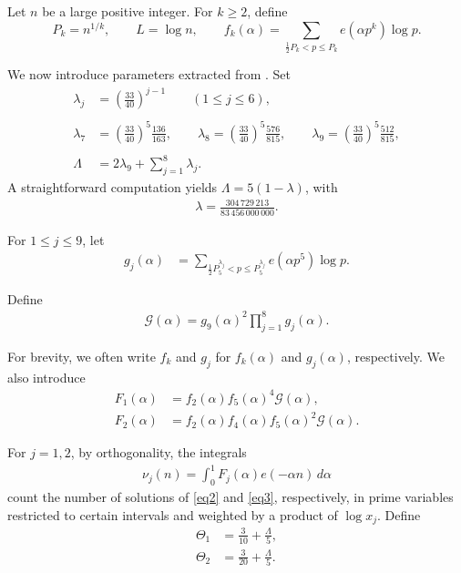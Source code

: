 \documentclass{article}
\theoremstyle{plain}
\begin{document}
Let $n$ be a large positive integer. For $k \geq 2$, define
$$P_k = n^{1/k}, \qquad L = \log n, \qquad f_k(\alpha)=\sum \limits_{\frac{1}{2}P_k < p \leq P_k} e(\alpha p^k)\log p.$$

We now introduce parameters extracted from \cite{KawadaWooley2001}. Set 
\begin{align*}
    \lambda_j&=\left(\frac{33}{40}\right)^{j-1} \qquad (1\leq j \leq 6),\\
    \\
    \lambda_7&=\left(\frac{33}{40}\right)^5\frac{136}{163},\qquad
    \lambda_8=\left(\frac{33}{40}\right)^5\frac{576}{815},\qquad \lambda_9 = \left(\frac{33}{40}\right)^5\frac{512}{815},\\ 
    \\
    \Lambda&=2\lambda_9+\sum_{j=1}^{8}\lambda_j.
\end{align*}
A straightforward computation yields $\Lambda = 5(1-\lambda)$, with 
\begin{align}\label{mu}
    \lambda=\frac{304\,729\,213}{83\,456\,000\,000}.
\end{align}

For $1\leq j \leq 9$, let 
\begin{align*}
    g_{j}(\alpha) &= \sum \limits_{\frac{1}{2}P_5^{\lambda_j} < p \leq P_5^{\lambda_j}} e(\alpha p^5)\log p.
\end{align*}

Define 
\begin{align*}
    \mathcal{G}(\alpha) = g_9(\alpha)^2\prod_{j=1}^{8}g_j(\alpha).
\end{align*}

For brevity, we often write $f_k$ and $g_j$ for $f_k(\alpha)$ and $g_j(\alpha)$, respectively. We also introduce
\begin{align*}
    F_1(\alpha)&=f_2(\alpha)f_5(\alpha)^4\mathcal{G}(\alpha),\\
    F_2(\alpha) &= f_2(\alpha)f_4(\alpha)f_5(\alpha)^2\mathcal{G}(\alpha).
\end{align*}

For $j=1,2$, by orthogonality, the integrals
\begin{align}\label{ort}
    \nu_j(n) = \int_{0}^{1} F_j(\alpha)e(-\alpha n)\,d\alpha
\end{align}
count the number of solutions of \eqref{eq2} and \eqref{eq3}, respectively, in prime variables restricted to certain intervals and weighted by a product of $\log x_j$. Define 
\begin{align*}
    \Theta_1 &= \frac{3}{10}+\frac{\Lambda}{5},\\
    \Theta_2 &= \frac{3}{20}+\frac{\Lambda}{5}.
\end{align*}
\end{document}
